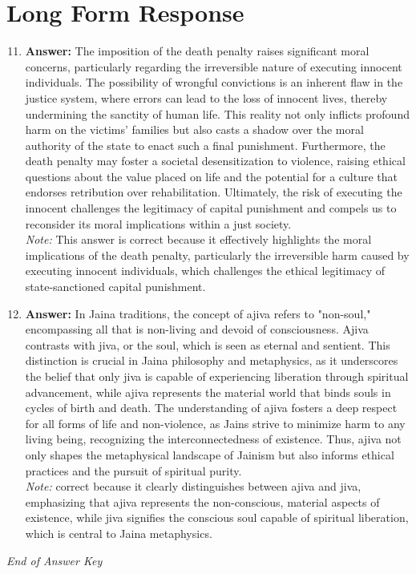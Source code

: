 \documentclass[12pt]{article}
\begin{document}
\section*{Long Form Response}
\begin{enumerate}[label=\arabic*.]
\setcounter{enumi}{10}
\item \textbf{Answer:} The imposition of the death penalty raises significant moral concerns, particularly regarding the irreversible nature of executing innocent individuals. The possibility of wrongful convictions is an inherent flaw in the justice system, where errors can lead to the loss of innocent lives, thereby undermining the sanctity of human life. This reality not only inflicts profound harm on the victims' families but also casts a shadow over the moral authority of the state to enact such a final punishment. Furthermore, the death penalty may foster a societal desensitization to violence, raising ethical questions about the value placed on life and the potential for a culture that endorses retribution over rehabilitation. Ultimately, the risk of executing the innocent challenges the legitimacy of capital punishment and compels us to reconsider its moral implications within a just society.
\\ \textit{Note:} This answer is correct because it effectively highlights the moral implications of the death penalty, particularly the irreversible harm caused by executing innocent individuals, which challenges the ethical legitimacy of state-sanctioned capital punishment.
\item \textbf{Answer:} In Jaina traditions, the concept of ajiva refers to "non-soul," encompassing all that is non-living and devoid of consciousness. Ajiva contrasts with jiva, or the soul, which is seen as eternal and sentient. This distinction is crucial in Jaina philosophy and metaphysics, as it underscores the belief that only jiva is capable of experiencing liberation through spiritual advancement, while ajiva represents the material world that binds souls in cycles of birth and death. The understanding of ajiva fosters a deep respect for all forms of life and non-violence, as Jains strive to minimize harm to any living being, recognizing the interconnectedness of existence. Thus, ajiva not only shapes the metaphysical landscape of Jainism but also informs ethical practices and the pursuit of spiritual purity.
\\ \textit{Note:} correct because it clearly distinguishes between ajiva and jiva, emphasizing that ajiva represents the non-conscious, material aspects of existence, while jiva signifies the conscious soul capable of spiritual liberation, which is central to Jaina metaphysics.
\end{enumerate}

\vfill
\noindent\textit{End of Answer Key}
\end{document}
